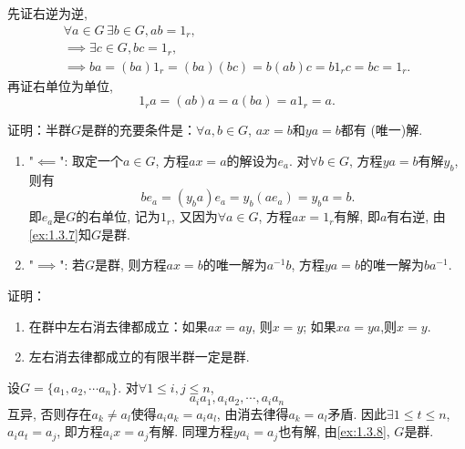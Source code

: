\begin{solution}
    先证右逆为逆, 
\[
\begin{gathered}
    \forall a \in G \, \exists b \in G, ab = 1_r,\\
    \implies \exists c \in G, bc = 1_r,\\
    \implies ba = (ba)1_r = (ba)(bc) = b(ab)c = b1_rc = bc = 1_r.
\end{gathered}
\]
    再证右单位为单位, 
\[
    1_ra = (ab)a = a(ba) = a1_r = a.
\]
\end{solution}

\begin{problem}\label{ex:1.3.8}
    证明：半群$G$是群的充要条件是：$\forall a, b \in G$, $ax = b$和$ya = b$都有
(唯一)解.
\end{problem}

\begin{solution}
\begin{enumerate}[(1)]
    \item "$\impliedby$": 取定一个$a \in G$, 方程$ax = a$的解设为$e_a$.
对$\forall b \in G$, 方程$ya = b$有解$y_b$, 则有
\[
    be_a = (y_ba)e_a = y_b(ae_a) = y_ba = b.
\]
即$e_a$是$G$的右单位, 记为$1_r$, 又因为$\forall a \in G$,
方程$ax = 1_r$有解, 即$a$有右逆, 由\ref{ex:1.3.7}知$G$是群.
    \item "$\implies$": 若$G$是群, 则方程$ax = b$的唯一解为$a^{-1}b$,
方程$ya = b$的唯一解为$ba^{-1}$.
\end{enumerate}
    
\end{solution}

\begin{problem}\label{ex:1.3.9}
    证明：
\begin{enumerate}[(1)]
    \item 在群中左右消去律都成立：如果$ax = ay$, 则$x = y$; 如果$xa = ya$,则$x = y$.
    \item 左右消去律都成立的有限半群一定是群.
\end{enumerate}
\end{problem}

\begin{solution}
    设$G = \{a_1, a_2, \cdots a_n\}$. 对$\forall 1 \leqslant i, j \leqslant n$,
\[
    a_ia_1, a_ia_2, \cdots, a_ia_n
\]
互异, 否则存在$a_k \neq a_l$使得$a_ia_k = a_ia_l$, 由消去律得$a_k = a_l$矛盾.
因此$\exists 1 \leqslant t \leqslant n$, $a_ia_t = a_j$, 即方程$a_ix = a_j$有解.
同理方程$ya_i = a_j$也有解, 由\ref{ex:1.3.8}, $G$是群.
\end{solution}

